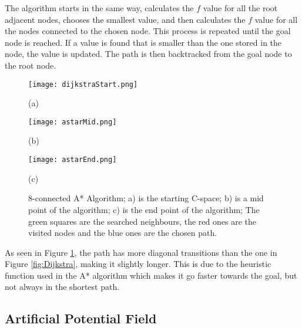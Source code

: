 The algorithm starts in the same way, calculates the $f$ value for all the root adjacent nodes, chooses the smallest value,
and then calculates the $f$ value for all the nodes connected to the chosen node. This process is repeated until the goal 
node is reached. If a value is found that is smaller than the one stored in the node, the value is updated. The path is then 
backtracked from the goal node to the root node.
\begin{figure}[htbp]
    \centering
    \begin{minipage}[b]{0.3\textwidth}
        \centering
        \texttt{[image: dijkstraStart.png]} %
        \caption{(a)}
    \end{minipage}
    \begin{minipage}[b]{0.3\textwidth}
        \centering
        \texttt{[image: astarMid.png]} %
        \caption{(b)}
    \end{minipage}
    \begin{minipage}[b]{0.3\textwidth}
        \centering
        \texttt{[image: astarEnd.png]} %
        \caption{(c)}
    \end{minipage}
    \caption{8-connected A* Algorithm; a) is the starting C-space; b) is a mid point of the algorithm; c) is the end point of the algorithm; The green squares are the searched neighbours, the red ones are the visited nodes and the blue ones are the chosen path.}
    \label{fig:A*}
\end{figure}

As seen in Figure \ref{fig:A*}, the path has more diagonal transitions than the one in 
Figure \ref{fig:Dijkstra}, making it slightly longer. This is due to the heuristic function used in the A* algorithm which 
makes it go faster towards the goal, but not always in the shortest path.

\subsection{Artificial Potential Field}
\label{subsec:APF}
